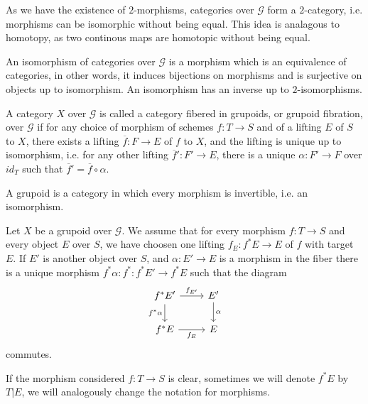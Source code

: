 \documentclass[
	oldfontcommands,
	sumario=abnt-6027-2012,
	12pt,			%
	openright,		%
	oneside,		%
	a4paper,		%
	english,		%
	brazil			%
	]{imecc-unicamp}
\begin{document}
As we have the existence of $2$-morphisms, categories over $\mathcal G$ form a $2$-category, i.e. morphisms can be isomorphic without being equal. This idea is analagous to homotopy, as two continous maps are homotopic without being equal.

\begin{definition}
	An isomorphism of categories over $\mathcal G$ is a morphism which is an equivalence of categories, in other words, it induces bijections on morphisms and is surjective on objects up to isomorphism. An isomorphism has an inverse up to $2$-isomorphisms.	
\end{definition}


\begin{definition}
	A category $X$ over $\mathcal G$ is called a category fibered in grupoids, or grupoid fibration, over $\mathcal G$ if for any choice of morphism of schemes $f:T\rightarrow S$ and of a lifting $E$ of $S$ to $X$, there exists a lifting $\overline f:F\rightarrow E$ of $f$ to $X$, and the lifting is unique up to isomorphism, i.e. for any other lifting $\overline f':F'\rightarrow E$, there is a unique $\alpha:F'\rightarrow F$ over $id_T$ such that $\overline f'=\overline{f}\circ \alpha$.
\end{definition}

\begin{definition}
	A grupoid is a category in which every morphism is invertible, i.e. an isomorphism.
	
\end{definition}

Let $X$ be a grupoid over $\mathcal G$. We assume that for every morphism $f:T\rightarrow S$ and every object $E$ over $S$, we have choosen one lifting $f_E:f^*E\rightarrow E$ of $f$ with target $E$. If $E'$ is another object over $S$, and $\alpha:E'\rightarrow E$ is a morphism in the fiber there is a unique morphism $f^*\alpha:f^*:f^*E'\rightarrow f^*E$ such that the diagram $$
\begin{tikzcd}
f^*E' \arrow[r, "f_{E'}"] \arrow[d, "f^*\alpha"'] & E' \arrow[d, "\alpha"] \\
f^*E \arrow[r, "f_E"']                            & E                     
\end{tikzcd}	
$$
commutes.

If the morphism considered $f:T\rightarrow S$ is clear, sometimes we will denote $f^*E$ by $T|E$, we will analogously change the notation for morphisms.
\end{document}
